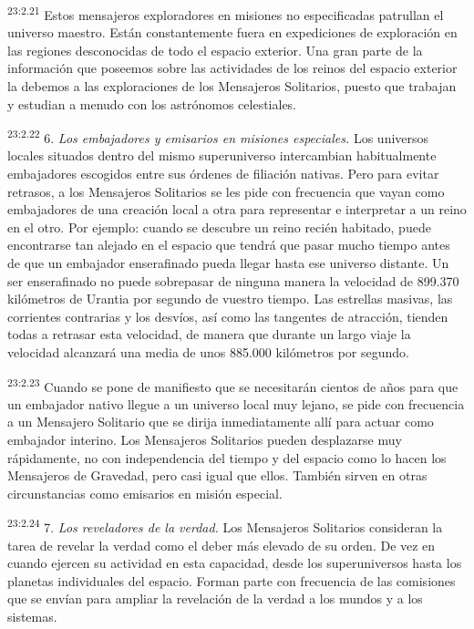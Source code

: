 \par
\textsuperscript{23:2.21} Estos mensajeros exploradores en misiones no especificadas patrullan el universo maestro. Están constantemente fuera en expediciones de exploración en las regiones desconocidas de todo el espacio exterior. Una gran parte de la información que poseemos sobre las actividades de los reinos del espacio exterior la debemos a las exploraciones de los Mensajeros Solitarios, puesto que trabajan y estudian a menudo con los astrónomos celestiales.

\par
\textsuperscript{23:2.22} 6. \textit{Los embajadores y emisarios en misiones especiales.} Los universos locales situados dentro del mismo superuniverso intercambian habitualmente embajadores escogidos entre sus órdenes de filiación nativas. Pero para evitar retrasos, a los Mensajeros Solitarios se les pide con frecuencia que vayan como embajadores de una creación local a otra para representar e interpretar a un reino en el otro. Por ejemplo: cuando se descubre un reino recién habitado, puede encontrarse tan alejado en el espacio que tendrá que pasar mucho tiempo antes de que un embajador enserafinado pueda llegar hasta ese universo distante. Un ser enserafinado no puede sobrepasar de ninguna manera la velocidad de 899.370 kilómetros de Urantia por segundo de vuestro tiempo. Las estrellas masivas, las corrientes contrarias y los desvíos, así como las tangentes de atracción, tienden todas a retrasar esta velocidad, de manera que durante un largo viaje la velocidad alcanzará una media de unos 885.000 kilómetros por segundo.

\par
\textsuperscript{23:2.23} Cuando se pone de manifiesto que se necesitarán cientos de años para que un embajador nativo llegue a un universo local muy lejano, se pide con frecuencia a un Mensajero Solitario que se dirija inmediatamente allí para actuar como embajador interino. Los Mensajeros Solitarios pueden desplazarse muy rápidamente, no con independencia del tiempo y del espacio como lo hacen los Mensajeros de Gravedad, pero casi igual que ellos. También sirven en otras circunstancias como emisarios en misión especial.

\par
\textsuperscript{23:2.24} 7. \textit{Los reveladores de la verdad.} Los Mensajeros Solitarios consideran la tarea de revelar la verdad como el deber más elevado de su orden. De vez en cuando ejercen su actividad en esta capacidad, desde los superuniversos hasta los planetas individuales del espacio. Forman parte con frecuencia de las comisiones que se envían para ampliar la revelación de la verdad a los mundos y a los sistemas.


